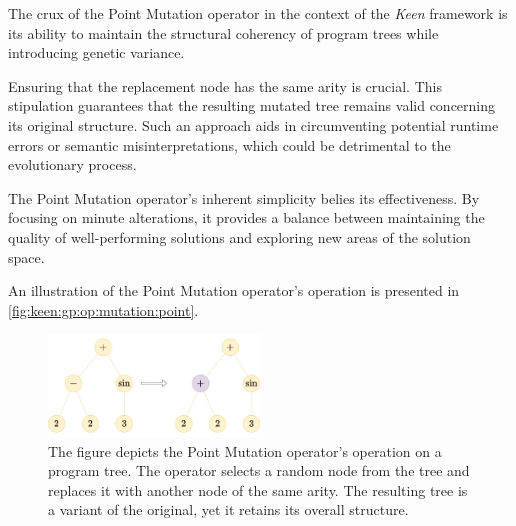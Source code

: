  The crux of the Point Mutation operator in the context of the \textit{Keen} 
  framework is its ability to maintain the structural coherency of program 
  trees while introducing genetic variance. 

  \begin{remark}
    Ensuring that the replacement node has the same arity is crucial. This 
    stipulation guarantees that the resulting mutated tree remains valid 
    concerning its original structure. Such an approach aids in circumventing 
    potential runtime errors or semantic misinterpretations, which could be 
    detrimental to the evolutionary process.
  \end{remark}

  The Point Mutation operator's inherent simplicity belies its effectiveness. By 
  focusing on minute alterations, it provides a balance between maintaining the 
  quality of well-performing solutions and exploring new areas of the solution 
  space.

  An illustration of the Point Mutation operator's operation is presented in
  \vref{fig:keen:gp:op:mutation:point}.

  \begin{figure}[ht!]
    \centering
    \includegraphics[width=0.5\textwidth]{img/keen/Point mutation.png}
    \caption{
      The figure depicts the Point Mutation operator's operation on a program 
      tree. The operator selects a random node from the tree and replaces it 
      with another node of the same arity. The resulting tree is a variant of 
      the original, yet it retains its overall structure.
    }
    \label{fig:keen:gp:op:mutation:point}
  \end{figure}
